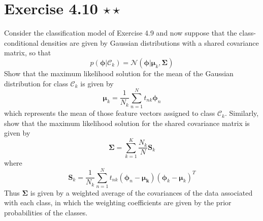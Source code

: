 \section*{Exercise 4.10 $\star \star$}
Consider the classification model of Exercise 4.9 and now suppose
that the class-conditional densities are given by Gaussian 
distributions with a shared covariance matrix, so that
\begin{equation*}
    p(\bm{\phi} | \mathcal{C}_k) = \mathcal{N}(\bm{\phi} | \bm{\mu}_k, \mathbf{\Sigma})
    \tag{4.160}\label{eq:4.160}
\end{equation*}
Show that the maximum likelihood solution for the mean of the
Gaussian distribution for class $\mathcal{C}_k$ is given by
\begin{equation*}
    \bm{\mu}_k = \frac{1}{N_k} \sum_{n=1}^{N} t_{nk} \bm{\phi}_n
    \tag{4.161}\label{eq:4.161}
\end{equation*}
which represents the mean of those feature vectors assigned
to class $\mathcal{C}_k$. Similarly, show that the maximum likelihood
solution for the shared covariance matrix is given by
\begin{equation*}
    \mathbf{\Sigma} = \sum_{k=1}^{K} \frac{N_k}{N}\mathbf{S}_k
    \tag{4.162}\label{eq:4.162}
\end{equation*}
where 
\begin{equation*}
    \mathbf{S}_k = \frac{1}{N_k} \sum_{n=1}^{N} 
    t_{nk}(\bm{\phi}_n - \bm{\mu_k})(\bm{\phi}_{k} - \bm{\mu}_k)^T
    \tag{4.163}\label{eq:4.163}
\end{equation*}
Thus $\mathbf{\Sigma}$ is given by a weighted average of the covariances
of the data associated with each class, in which the weighting coefficients
are given by the prior probabilities of the classes.

\vspace{1em}

